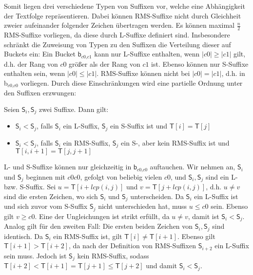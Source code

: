 Somit liegen drei verschiedene Typen von Suffixen vor, welche eine Abhängigkeit der Textfolge repräsentieren. Dabei können RMS-Suffixe nicht durch Gleichheit zweier aufeinander folgender Zeichen übertragen werden. Es können maximal $\frac{n}{2}$ RMS-Suffixe vorliegen, da diese durch L-Suffixe definiert sind. Insbesondere schränkt die Zuweisung von Typen zu den Suffixen die Verteilung dieser auf Buckets ein: Ein Bucket $\mathsf{b}_{\textit{c0,c1}}$ kann nur L-Suffixe enthalten, wenn $|c0| \geq |c1|$ gilt, d.h. der Rang von $c0$ größer als der Rang von $c1$ ist. Ebenso können nur S-Suffixe enthalten sein, wenn $|c0| \leq |c1|$. RMS-Suffixe können nicht bei $|c0|=|c1|$, d.h. in b$_{\textit{c0,c0}}$ vorliegen.
Durch diese Einschränkungen wird eine partielle Ordnung unter den Suffixen erzwungen:
\begin{lemma}
	Seien $\mathsf{S}_i, \mathsf{S}_j$ zwei Suffixe. Dann gilt:
	\begin{itemize}
		\item $\mathsf{S}_i < \mathsf{S}_j$, falls $\mathsf{S}_i$ ein L-Suffix, $\mathsf{S}_j$ ein S-Suffix ist und $\mathsf{T}[i] = \mathsf{T}[j]$
		\item $\mathsf{S}_i < \mathsf{S}_j$, falls $\mathsf{S}_i$ ein RMS-Suffix, $\mathsf{S}_j$ ein S-, aber kein RMS-Suffix ist und $\mathsf{T}[i, i+1] = \mathsf{T}[j, j+1]$
	\end{itemize}
\end{lemma}
	L- und S-Suffixe können nur gleichzeitig in $\mathsf{b}_{\textit{c0,c0}}$ auftauchen. Wir nehmen an, $\mathsf{S}_i$ und $\mathsf{S}_j$ beginnen mit $c0c0$, gefolgt von beliebig vielen $c0$, und $\mathsf{S}_i, \mathsf{S}_j$ sind ein L- bzw. S-Suffix. Sei $u = \mathsf{T}[i+lcp(i, j)]$ und $v = \mathsf{T}[j+lcp(i, j)]$, d.h. $u \neq v$ sind die ersten Zeichen, wo sich $\mathsf{S}_i$ und $\mathsf{S}_j$ unterscheiden. Da $\mathsf{S}_i$ ein L-Suffix ist und sich zuvor vom S-Suffix $\mathsf{S}_j$ nicht unterschieden hat, muss $u \leq c0$ sein. Ebenso gilt $v \geq c0$. Eine der Ungleichungen ist strikt erfüllt, da $u \neq v$, damit ist $\mathsf{S}_i < \mathsf{S}_j$.
	Analog gilt für den zweiten Fall: Die ersten beiden Zeichen von $\mathsf{S}_i, \mathsf{S}_j$ sind identisch. Da $\mathsf{S}_i$ ein RMS-Suffix ist, gilt $\mathsf{T}[i] \neq \mathsf{T}[i+1]$. Ebenso gilt $\mathsf{T}[i+1] > \mathsf{T}[i+2]$, da nach der Definition von RMS-Suffixen $\mathsf{S}_{i+2}$ ein L-Suffix sein muss. Jedoch ist $\mathsf{S}_j$ kein RMS-Suffix, sodass $\mathsf{T}[i+2] < \mathsf{T}[i+1] = \mathsf{T}[j+1] \leq \mathsf{T}[j+2]$ und damit $\mathsf{S}_i < \mathsf{S}_j$. 

